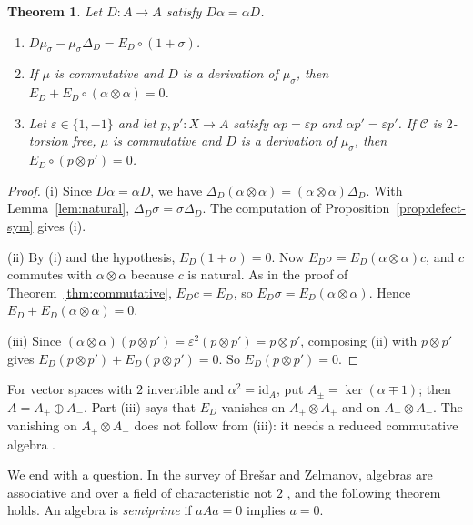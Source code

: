 \documentclass[]{interact}
\theoremstyle{plain}
\newtheorem{theorem}{Theorem}[section]
\theoremstyle{definition}
\theoremstyle{remark}
\newcommand{\id}{\mathrm{id}}
\begin{document}
\begin{theorem}\label{thm:twisted}
Let $D \colon A \to A$ satisfy $D \alpha = \alpha D$.
\begin{enumerate}[label=(\roman*)]
\item $D \mu_\sigma - \mu_\sigma \Delta_D = E_D \circ (1 + \sigma)$.
\item If $\mu$ is commutative and $D$ is a derivation of $\mu_\sigma$, then $E_D + E_D \circ (\alpha \otimes \alpha) = 0$.
\item Let $\varepsilon \in \{1, -1\}$ and let $p, p' \colon X \to A$ satisfy $\alpha p = \varepsilon p$ and $\alpha p' = \varepsilon p'$. If $\mathcal{C}$ is $2$-torsion free, $\mu$ is commutative and $D$ is a derivation of $\mu_\sigma$, then $E_D \circ (p \otimes p') = 0$.
\end{enumerate}
\end{theorem}

\begin{proof}
(i) Since $D \alpha = \alpha D$, we have $\Delta_D (\alpha \otimes \alpha) = (\alpha \otimes \alpha) \Delta_D$.
With Lemma~\ref{lem:natural}, $\Delta_D \sigma = \sigma \Delta_D$.
The computation of Proposition~\ref{prop:defect-sym} gives (i).

(ii) By (i) and the hypothesis, $E_D (1 + \sigma) = 0$.
Now $E_D \sigma = E_D (\alpha \otimes \alpha) c$, and $c$ commutes with $\alpha \otimes \alpha$ because $c$ is natural.
As in the proof of Theorem~\ref{thm:commutative}, $E_D c = E_D$, so $E_D \sigma = E_D (\alpha \otimes \alpha)$.
Hence $E_D + E_D (\alpha \otimes \alpha) = 0$.

(iii) Since $(\alpha \otimes \alpha)(p \otimes p') = \varepsilon^2 (p \otimes p') = p \otimes p'$, composing (ii) with $p \otimes p'$ gives $E_D (p \otimes p') + E_D (p \otimes p') = 0$.
So $E_D (p \otimes p') = 0$.
\end{proof}

For vector spaces with $2$ invertible and $\alpha^2 = \id_A$, put $A_\pm = \ker(\alpha \mp 1)$; then $A = A_+ \oplus A_-$.
Part (iii) says that $E_D$ vanishes on $A_+ \otimes A_+$ and on $A_- \otimes A_-$. %
The vanishing on $A_+ \otimes A_-$ does not follow from (iii): it needs a reduced commutative algebra \citep[Theorem 4.1]{Adrabi2026a}. %

We end with a question.
In the survey of Bre\v{s}ar and Zelmanov, algebras are associative and over a field of characteristic not $2$ \citep[Section 1 and Section 11]{BresarZelmanov2025}, and the following theorem holds.
An algebra is \emph{semiprime} if $aAa = 0$ implies $a = 0$.
\end{document}
